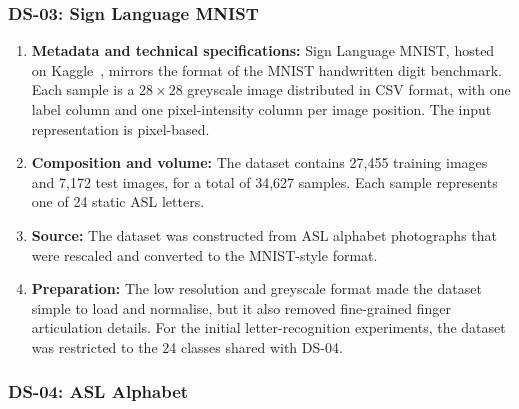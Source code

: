 \subsubsection*{DS-03: Sign Language MNIST}

\begin{enumerate}
    \item \textbf{Metadata and technical specifications:} Sign Language MNIST, hosted on Kaggle~\cite{signlanguagemnist}, mirrors the format of the MNIST
          handwritten digit benchmark. Each sample is a $28 \times 28$ greyscale image distributed in CSV
          format, with one label column and one pixel-intensity column per image position. The input
          representation is pixel-based.

    \item \textbf{Composition and volume:} The dataset contains 27,455 training images and 7,172 test images, for a total of 34,627 samples.
          Each sample represents one of 24 static ASL letters.

    \item \textbf{Source:} The dataset was constructed from ASL alphabet photographs that were rescaled and converted to the
          MNIST-style format.

    \item \textbf{Preparation:} The low resolution and greyscale format made the dataset simple to load and normalise, but it also
          removed fine-grained finger articulation details. For the initial letter-recognition experiments,
          the dataset was restricted to the 24 classes shared with DS-04.

\end{enumerate}

\subsubsection*{DS-04: ASL Alphabet}

